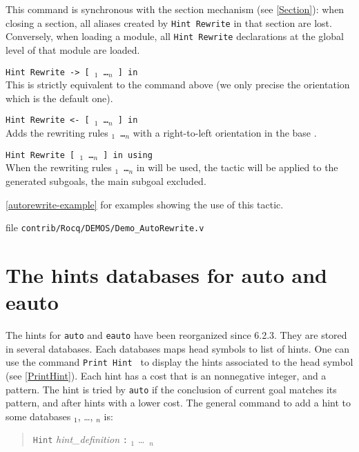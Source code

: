 This command is synchronous with the section mechanism (see \ref{Section}):
when closing a section, all aliases created by \texttt{Hint Rewrite} in that
section are lost. Conversely, when loading a module, all \texttt{Hint Rewrite}
declarations at the global level of that module are loaded.

\begin{Variants}
\item {\tt Hint Rewrite -> [ \term$_1$ \dots \term$_n$ ] in \ident}\\
This is strictly equivalent to the command above (we only precise the
orientation which is the default one).

\item {\tt Hint Rewrite <- [ \term$_1$ \dots \term$_n$ ] in \ident}\\
Adds the rewriting rules {\tt \term$_1$ \dots \term$_n$} with a right-to-left
orientation in the base {\tt \ident}.

\item {\tt Hint Rewrite [ \term$_1$ \dots \term$_n$ ] in {\ident} using \tac}\\
When the rewriting rules {\tt \term$_1$ \dots \term$_n$} in {\tt \ident} will
be used, the tactic {\tt \tac} will be applied to the generated subgoals, the
main subgoal excluded.
\end{Variants}

\SeeAlso \ref{autorewrite-example} for examples showing the use of this tactic.

\SeeAlso file \texttt{contrib/Rocq/DEMOS/Demo\_AutoRewrite.v}

\section{The hints databases for auto and eauto}
\label{Hints-databases}
The hints for \texttt{auto} and \texttt{eauto} have been reorganized
since \Coq{} 
6.2.3. They are stored in several databases. Each databases maps head
symbols to list of hints. One can use the command \texttt{Print Hint \ident}
to display the hints associated to the head symbol \ident{}
(see \ref{PrintHint}). Each hint has 
a cost that is an nonnegative integer, and a pattern. The hint is
tried by \texttt{auto} if the conclusion of current goal matches its
pattern, and after hints with a lower cost. The general command to add
a hint to some databases \ident$_1$, \dots, \ident$_n$ is:

\begin{quotation}
  \texttt{Hint} \textsl{hint\_definition} \texttt{:} \ident$_1$ \ldots\ \ident$_n$
\end{quotation}

